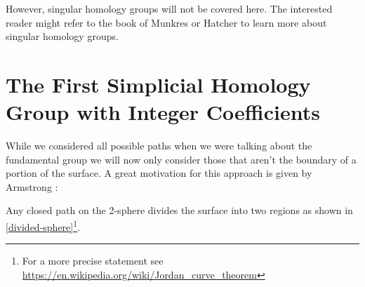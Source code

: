 \documentclass[draft]{scrartcl}
\theoremstyle{plain}
\theoremstyle{definition}
\theoremstyle{remark}
\newcommand{\SH}{Simplicial Homology}
\begin{document}
However, singular homology groups will not be covered here. The interested reader might refer to the book of Munkres \cite{mu} or Hatcher \cite{ha} to learn more about singular homology groups.

\section{The First \SH{} Group with Integer Coefficients}\label{first-hom}

While we considered all possible paths when we were talking about the fundamental group we will now only consider those that aren't the boundary of a portion of the surface. A great motivation for this approach is given by Armstrong \cite[p. 173f]{ar}:

Any closed path on the 2-sphere divides the surface into two regions as shown in \autoref{divided-sphere}\footnote{For a more precise statement see \url{https://en.wikipedia.org/wiki/Jordan_curve_theorem}}.
\end{document}
